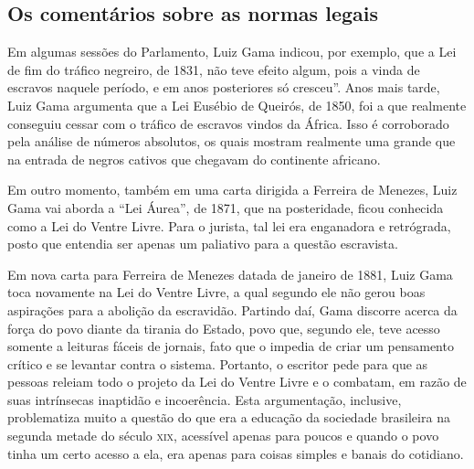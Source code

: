 \documentclass[12pt]{extarticle}
\begin{document}
\subsection{Os comentários sobre as normas legais}

Em algumas sessões do Parlamento, Luiz Gama indicou, por exemplo, que a
Lei de fim do tráfico negreiro, de 1831, não teve efeito algum, pois a
vinda de escravos naquele período, e em anos posteriores só cresceu''.
Anos mais tarde, Luiz Gama argumenta que a Lei Eusébio de Queirós, de
1850, foi a que realmente conseguiu cessar com o tráfico de escravos
vindos da África. Isso é corroborado pela análise de números absolutos,
os quais mostram realmente uma grande que na entrada de negros cativos
que chegavam do continente africano.

Em outro momento, também em uma carta dirigida a Ferreira de Menezes,
Luiz Gama vai aborda a ``Lei Áurea'', de 1871, que na posteridade, ficou
conhecida como a Lei do Ventre Livre. Para o jurista, tal lei era
enganadora e retrógrada, posto que entendia ser apenas um paliativo para
a questão escravista.






Em nova carta para Ferreira de Menezes datada de janeiro de 1881, Luiz
Gama toca novamente na Lei do Ventre Livre, a qual segundo ele não gerou
boas aspirações para a abolição da escravidão. Partindo daí, Gama
discorre acerca da força do povo diante da tirania do Estado, povo que,
segundo ele, teve acesso somente a leituras fáceis de jornais, fato que
o impedia de criar um pensamento crítico e se levantar contra o sistema.
Portanto, o escritor pede para que as pessoas releiam todo o projeto da
Lei do Ventre Livre e o combatam, em razão de suas intrínsecas inaptidão
e incoerência. Esta argumentação, inclusive, problematiza muito a
questão do que era a educação da sociedade brasileira na segunda metade
do século \textsc{xix}, acessível apenas para poucos e quando o povo tinha um
certo acesso a ela, era apenas para coisas simples e banais do
cotidiano.


\end{document}
